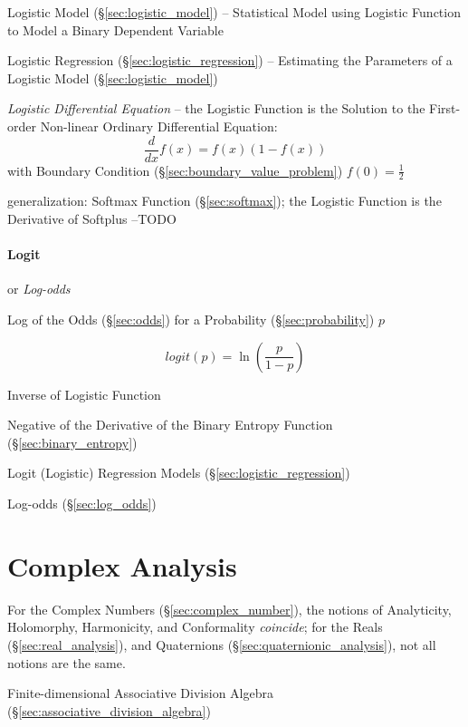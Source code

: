 \fist Logistic Model (\S\ref{sec:logistic_model}) -- Statistical Model using
Logistic Function to Model a Binary Dependent Variable

\fist Logistic Regression (\S\ref{sec:logistic_regression}) -- Estimating the
Parameters of a Logistic Model (\S\ref{sec:logistic_model})

\emph{Logistic Differential Equation} -- the Logistic Function is the Solution
to the First-order Non-linear Ordinary Differential Equation:
\[
  \frac{d}{dx}f(x) = f(x)(1 - f(x))
\]
with Boundary Condition (\S\ref{sec:boundary_value_problem}) $f(0) =
\frac{1}{2}$

\fist generalization: Softmax Function (\S\ref{sec:softmax}); the Logistic
Function is the Derivative of Softplus --TODO



\paragraph{Logit}\label{sec:logit}\hfill

or \emph{Log-odds}

Log of the Odds (\S\ref{sec:odds}) for a Probability (\S\ref{sec:probability})
$p$

\[
  logit(p) = \ln (\frac{p}{1-p})
\]

Inverse of Logistic Function

Negative of the Derivative of the Binary Entropy Function
(\S\ref{sec:binary_entropy})

Logit (Logistic) Regression Models (\S\ref{sec:logistic_regression})

Log-odds (\S\ref{sec:log_odds})



\section{Complex Analysis}\label{sec:complex_analysis}

For the Complex Numbers (\S\ref{sec:complex_number}), the notions of
Analyticity, Holomorphy, Harmonicity, and Conformality \emph{coincide}; for the
Reals (\S\ref{sec:real_analysis}), and Quaternions
(\S\ref{sec:quaternionic_analysis}), not all notions are the same.

Finite-dimensional Associative Division Algebra
(\S\ref{sec:associative_division_algebra})


